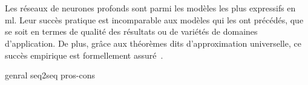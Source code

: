 
\section{}

Les réseaux de neurones profonds sont parmi les modèles les plus expressifs en \gls{ml}.
Leur succès pratique est incomparable aux modèles qui les ont précédés, 
que se soit en termes de qualité des résultats ou de variétés de domaines d'application.
De plus, grâce aux théorèmes dits d'approximation universelle, 
ce succès empirique est formellement assuré~\parencite{Calin_2020}.

{genral}
{seq2seq}
{pros-cons}